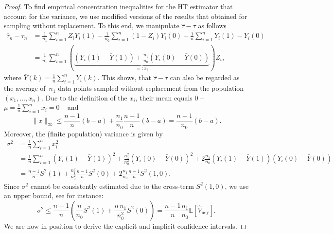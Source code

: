 \documentclass[aos]{imsart2}
\theoremstyle{plain}
\theoremstyle{definition}
\newcommand{\E}{\mathbb{E}}
\newcommand{\yb}{\bar{Y}}
\newcommand{\vhn}{\hat{V}_{\mathrm{ney}}}
\newcommand{\tauh}{\hat{\tau}}
\begin{document}
\begin{appendix}
\begin{proof}
    To find empirical concentration inequalities for the HT estimator that account for the variance, we use modified versions of the results that \cite{bardenet_concentration_2015} obtained for sampling without replacement. To this end, we manipulate $\tauh - \tau$ as follows
    \begin{align*}
        \tauh_n - \tau_n &= \frac{1}{n_1} \sum_{i=1}^n Z_i Y_i(1) - \frac{1}{n_0} \sum_{i=1}^n (1-Z_i) Y_i(0) - \frac{1}{n} \sum_{i=1}^n Y_i(1)-Y_i(0) \\
        &= \frac{1}{n_1} \sum_{i=1}^n \left(\underbrace{(Y_i(1)-\yb(1))+\frac{n_1}{n_0}(Y_i(0)-\yb(0))}_{=:x_i}\right) Z_i,
    \end{align*}
    where $\yb(k) = \frac{1}{n}\sum_{i=1}^n Y_i(k)$. This shows, that $\tauh-\tau$ can also be regarded as the average of~$n_1$ data points sampled without replacement from the population $(x_1,\ldots,x_n)$. Due to the definition of the $x_i$, their mean equals 0 -- $\mu = \frac{1}{n}\sum_{i=1}^n x_i =0$ -- and
    \begin{equation*}
        \lVert x \rVert_\infty \leq \frac{n-1}{n} (b-a) + \frac{n_1}{n_0}\frac{n-1}{n} (b-a) = \frac{n-1}{n_0} (b-a).
    \end{equation*}
    Moreover, the (finite population) variance is given by
    \begin{align*}
        \sigma^2 &= \frac{1}{n} \sum_{i=1}^n x_i^2\\
        &= \frac{1}{n} \sum_{i=1}^n (Y_i(1)-\yb(1))^2+\frac{n_1^2}{n_0^2} (Y_i(0)-\yb(0))^2 + 2\frac{n_1}{n_0}(Y_i(1)-\yb(1))(Y_i(0)-\yb(0))\\
        &= \frac{n-1}{n} S^2(1) + \frac{n_1^2}{n_0^2} \frac{n-1}{n}S^2(0) + 2\frac{n_1}{n_0}\frac{n-1}{n} S^2(1,0).
    \end{align*}
    Since $\sigma^2$ cannot be consistently estimated due to the cross-term $S^2(1,0)$, we use an upper bound, see \cite[Lem.~4.1]{ding_first_2024} for instance:
    \begin{equation}\label{eq:sigma-upper-bound}
        \sigma^2 %
        \leq \frac{n-1}{n} \left(\frac{n}{n_0}S^2(1)+\frac{n \,n_1}{n_0^2}S^2(0)\right) = \frac{n-1}{n}\frac{n_1}{n_0} \E[\vhn].
    \end{equation}
    We are now in position to derive the explicit and implicit confidence intervals.



\end{proof}
\end{appendix}
\end{document}
